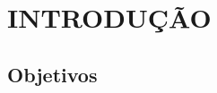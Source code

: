 \pagestyle{myheadings}
\setcounter{page}{16} %

\justifying

\section{INTRODUÇÃO}

\lipsum[1-6]

\subsection{Objetivos}

\lipsum[1-1]

